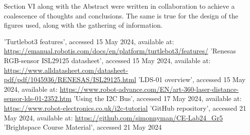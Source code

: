 \documentclass[conference]{IEEEtran}
\begin{document}
Section VI along with the Abstract were written in collaboration to achieve a coalescence of thoughts and conclusions.
The same is true for the design of the figures used, along with the gathering of information.
\begin{thebibliography}{00}
 'Turtlebot3 features', accessed 15 May 2024, available at: \url{https://emanual.robotis.com/docs/en/platform/turtlebot3/features/}
 'Renesas RGB-sensor ISL29125 datasheet', accessed 15 May 2024, available at: \url{https://www.alldatasheet.com/datasheet-pdf/pdf/1045936/RENESAS/ISL29125.html}
 'LDS-01 overview', accessed 15 May 2024, available at: \url{https://www.robot-advance.com/EN/art-360-laser-distance-sensor-lds-01-2352.htm}
 'Using the I2C Bus', accessed 17 May 2024, available at: \url{https://www.robot-electronics.co.uk/i2c-tutorial}
 'GitHub repository', accessed 21 May 2024, available at: \url{https://github.com/simonnyman/CE-Lab24_Gr5}
 'Brightspace Course Material', accessed 21 May 2024
\end{thebibliography}
\end{document}
